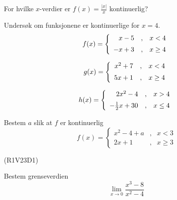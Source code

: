 





\opgt

For hvilke $ x $-verdier er $ f(x)=\frac{|x|}{x} $ kontinuerlig?

Undersøk om funksjonene er kontinuerlige for $ x=4 $.
\begin{equation*}
	f(x)= \left\lbrace{
		\begin{array}{rcr}
			x-5 &,&x<4 \br
			-x+3   &,& x\geq 4
		\end{array}
	}\right. 
\end{equation*}

\begin{equation*}
	g(x)= \left\lbrace{
		\begin{array}{rcr}
			x^2+7 &,&x<4 \br
			5x+1   &,& x\geq 4
		\end{array}
	}\right. 
\end{equation*}

\begin{equation*}
	h(x)= \left\lbrace{
		\begin{array}{rcr}
			2x^2-4 &,&x>4 \br
			-\frac{1}{2}x+30   &,& x\leq 4
		\end{array}
	}\right. 
\end{equation*}

Bestem $ a $ slik at $ f $ er kontinuerlig
\begin{equation*}
	f(x)= \left\lbrace{
		\begin{array}{rcr}
			x^2 - 4 + a &,& x < 3 \\
			2x + 1 & ,& x \geq 3
		\end{array}
	}\right. 
\end{equation*}

\newpage
{} (R1V23D1) \os

Bestem grenseverdien
\[ \lim\limits_{x\to0}\frac{x^3-8}{x^2-4} \]


